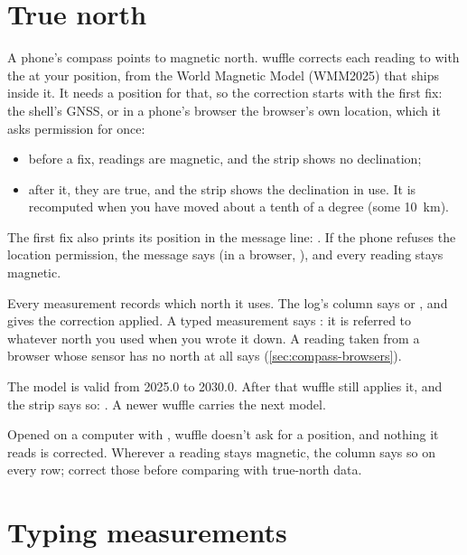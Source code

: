 \section{True north}\label{sec:true-north}

A phone's compass points to magnetic north. wuffle corrects each reading to  with the
 at your position, from the World Magnetic Model (WMM2025) that ships inside it. It
needs a position for that, so the correction starts with the first fix: the shell's GNSS, or in a phone's
browser the browser's own location, which it asks permission for once:

\begin{itemize}
\item before a fix, readings are magnetic, and the strip shows no declination;
\item after it, they are true, and the strip shows the declination in use. It is recomputed when you have
moved about a tenth of a degree (some 10~km).
\end{itemize}

The first fix also prints its position in the message line: .
If the phone refuses the location permission, the message says  (in a browser, ), and every reading stays magnetic.

Every measurement records which north it uses. The log's  column says  or
, and  gives the correction applied. A typed measurement says
: it is referred to whatever north you used when you wrote it down. A reading taken from a
browser whose sensor has no north at all says  (\cref{sec:compass-browsers}).

The model is valid from 2025.0 to 2030.0. After that wuffle still applies it, and the strip says so:
. A newer wuffle carries the next model.

\begin{caution}
Opened on a computer with , wuffle doesn't ask for a position, and nothing it reads is
corrected. Wherever a reading stays magnetic, the  column says so on every row; correct those
before comparing with true-north data.
\end{caution}

\section{Typing measurements}\label{sec:manual-entry}

